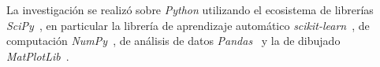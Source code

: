 
La investigación se realizó sobre \textit{Python} utilizando el ecosistema de librerías \textit{SciPy}~\cite{tool:scipy}, en particular la librería de aprendizaje automático \textit{scikit-learn}~\cite{tool:scikit-learn}, de computación \textit{NumPy}~\cite{tool:numpy}, de análisis de datos \textit{Pandas}~\cite{tool:pandas} y la de dibujado \textit{MatPlotLib}~\cite{tool:matplotlib}.



